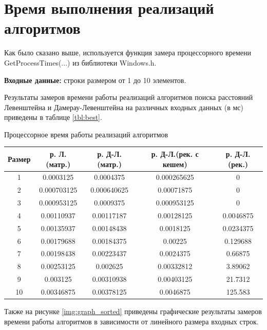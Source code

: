 \section{Время выполнения реализаций алгоритмов}

Как было сказано выше, используется функция замера процессорного времени GetProcessTimes(...) из библиотеки Windows.h. 

\textbf{Входные данные:} строки размером от 1 до 10 элементов.

Результаты замеров времени работы реализаций алгоритмов поиска расстояний Левенштейна и Дамерау-Левенштейна на различных входных данных (в мс) приведены в таблице \ref{tbl:best}.
\begin{center}
	\begin{threeparttable}
		\caption{Процессорное время работы реализаций алгоритмов}
		\label{tbl:best}
		\begin{tabular}{|c|c|c|c|c|}
			\hline
			Размер &р. Л.(матр.) &р. Д-Л.(матр.)  &р. Д-Л.(рек. с кешем)& р. Д-Л.(рек.)\\
			\hline
			1 &  0.0003125  &    0.0004375    &0.000265625 &             0\\
			\hline
			2 &  0.000703125 &   0.000640625    & 0.00071875&              0\\
		\hline
			3 &  0.000953125  &    0.0009375   & 0.000953125 &             0\\
		\hline
			4 & 0.00110937     &0.00117187    & 0.00128125    &  0.0046875\\
		\hline
			5 &  0.00135937     &0.00148438      &0.0018125    &  0.0234375\\
		\hline
			6 & 0.00179688 &    0.00184375      &  0.00225      & 0.129688\\
		\hline
			7 &  0.00198438 &    0.00223437    &  0.0024375      &  0.66875\\
		\hline
			8 & 0.00253125   &    0.002625    & 0.00332812        &3.89062\\
		\hline
			9 & 0.003125 &    0.00310938     &0.00403125      &  21.7312\\
		\hline
			10 & 0.00346875 &    0.00378125 &     0.0046875    &    125.583\\
		\hline
		\end{tabular}
		
	\end{threeparttable}
\end{center}
Также на рисунке \ref{img:graph_sorted} приведены графические результаты замеров времени работы алгоритмов в зависимости от линейного размера входных строк.

